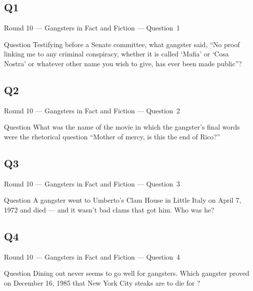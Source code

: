 \documentclass[11pt]{beamer}
\begin{document}
\subsection*{Q1}
\begin{frame}[t]{Round 10 --- Gangsters in Fact and Fiction --- \mbox{Question 1}}
\begin{block}{Question}
Testifying before a Senate committee, what gangster said, ``No proof linking me to any criminal conspiracy, whether it is called `Mafia' or `Cosa Nostra' or whatever other name you wish to give,  has ever been made public''?
\end{block}
\end{frame}
\subsection*{Q2}
\begin{frame}[t]{Round 10 --- Gangsters in Fact and Fiction --- \mbox{Question 2}}
\begin{block}{Question}
What was the name of the movie in which the gangster's final words were the rhetorical question ``Mother of mercy, is this the end of Rico?''
\end{block}
\end{frame}
\subsection*{Q3}
\begin{frame}[t]{Round 10 --- Gangsters in Fact and Fiction --- \mbox{Question 3}}
\begin{block}{Question}
A gangster went to Umberto's Clam House in Little Italy on April 7, 1972 and died --- and it wasn't bad clams that got him.  Who was he?
\end{block}
\end{frame}
\subsection*{Q4}
\begin{frame}[t]{Round 10 --- Gangsters in Fact and Fiction --- \mbox{Question 4}}
\begin{block}{Question}
Dining out never seems to go well for gangsters. Which gangster proved on December 16, 1985 that New York City steaks are to die for ?
\end{block}
\end{frame}
\end{document}
